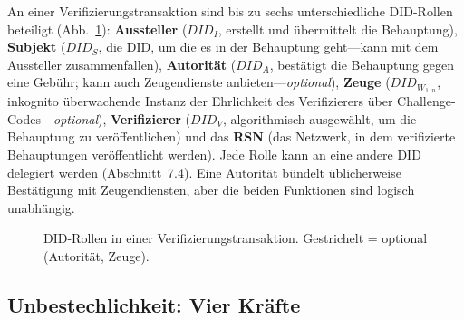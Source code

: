 \documentclass[11pt,a4paper,twocolumn]{article}
\begin{document}
An einer Verifizierungstransaktion sind bis zu sechs unterschiedliche DID-Rollen beteiligt (Abb.~\ref{fig:roles}): \textbf{Aussteller} ($DID_I$, erstellt und übermittelt die Behauptung), \textbf{Subjekt} ($DID_S$, die DID, um die es in der Behauptung geht---kann mit dem Aussteller zusammenfallen), \textbf{Autorität} ($DID_A$, bestätigt die Behauptung gegen eine Gebühr; kann auch Zeugendienste anbieten---\emph{optional}), \textbf{Zeuge} ($DID_{W_{1..n}}$, inkognito überwachende Instanz der Ehrlichkeit des Verifizierers über Challenge-Codes---\emph{optional}), \textbf{Verifizierer} ($DID_V$, algorithmisch ausgewählt, um die Behauptung zu veröffentlichen) und das \textbf{RSN} (das Netzwerk, in dem verifizierte Behauptungen veröffentlicht werden). Jede Rolle kann an eine andere DID delegiert werden (Abschnitt~7.4). Eine Autorität bündelt üblicherweise Bestätigung mit Zeugendiensten, aber die beiden Funktionen sind logisch unabhängig.

\begin{figure}[ht]
\centering
{}
\caption{DID-Rollen in einer Verifizierungstransaktion. Gestrichelt = optional (Autorität, Zeuge).}
\label{fig:roles}
\end{figure}

\subsection{Unbestechlichkeit: Vier Kräfte}
\end{document}
